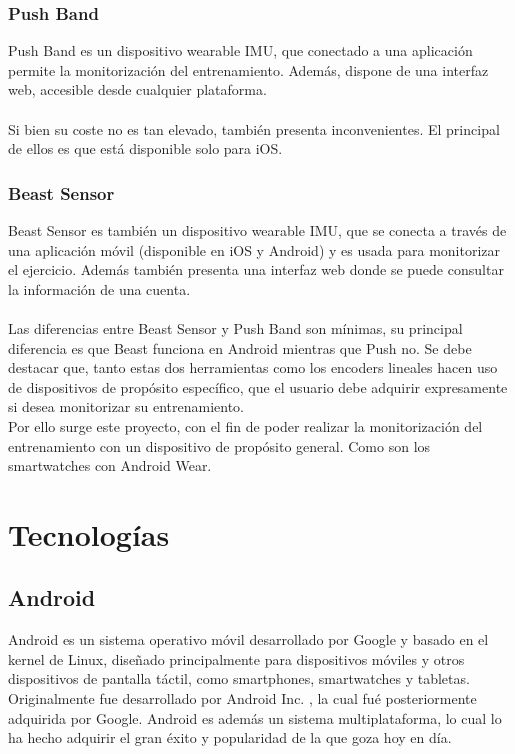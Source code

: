 \subsubsection*{Push Band}

Push Band es un dispositivo wearable IMU, que conectado a una aplicación permite la monitorización del entrenamiento. Además, dispone de una interfaz web, accesible desde cualquier plataforma\cite{push}.
\\
\\
Si bien su coste no es tan elevado, también presenta inconvenientes. El principal de ellos es que está disponible solo para iOS.

\subsubsection*{Beast Sensor}

Beast Sensor es también un dispositivo wearable IMU, que se conecta a través de una aplicación móvil (disponible en iOS y Android) y es usada para monitorizar el ejercicio\cite{beast}. Además también presenta una interfaz web donde se puede consultar la información de una cuenta.
\\
\\
Las diferencias entre Beast Sensor y Push Band son mínimas, su principal diferencia es que Beast funciona en Android mientras que Push no. Se debe destacar que, tanto estas dos herramientas como los encoders lineales hacen uso de dispositivos de propósito específico, que el usuario debe adquirir expresamente si desea monitorizar su entrenamiento.
\\
Por ello surge este proyecto, con el fin de poder realizar la monitorización del entrenamiento con un dispositivo de propósito general. Como son los smartwatches con Android Wear.


\section{Tecnologías}

\subsection{Android}

Android es un sistema operativo móvil desarrollado por Google y basado en el kernel de Linux, diseñado principalmente para dispositivos móviles y otros dispositivos de pantalla táctil, como smartphones, smartwatches y tabletas. Originalmente fue desarrollado por Android Inc. , la cual fué posteriormente adquirida por Google. Android es además un sistema multiplataforma, lo cual lo ha hecho adquirir el gran éxito y popularidad de la que goza hoy en día.

